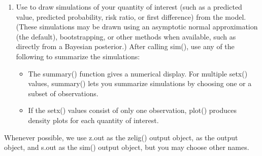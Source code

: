 \documentclass[letterpaper,10pt,english]{sphinxmanual}
\begin{document}
\begin{enumerate}
\item {} 
Use  to draw simulations of your quantity of interest (such
as a predicted value, predicted probability, risk ratio, or first
difference) from the model. (These simulations may be drawn using an
asymptotic normal approximation (the default), bootstrapping, or
other methods when available, such as directly from a Bayesian
posterior.) After calling sim(), use any of the following to
summarize the simulations:
\begin{itemize}
\item {} 
The summary() function gives a numerical display. For multiple
setx() values, summary() lets you summarize simulations by
choosing one or a subset of observations.

\item {} 
If the setx() values consist of only one observation, plot()
produces density plots for each quantity of interest.

\end{itemize}

\end{enumerate}

Whenever possible, we use z.out as the zelig() output object, 
as the  output object, and s.out as the sim() output object,
but you may choose other names.
\end{document}
